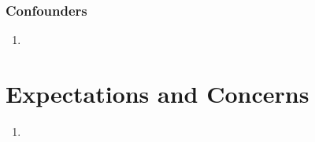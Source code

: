 \documentclass[12pt]{article}
\begin{document}
\subsubsection{Confounders}

\begin{enumerate}[itemsep=0em,label={\roman*.}]
\item{}
\end{enumerate}

\section{Expectations and Concerns}

\begin{enumerate}[itemsep=0em,label={(\alph*)}]
\item{}
\end{enumerate}



\end{document}
